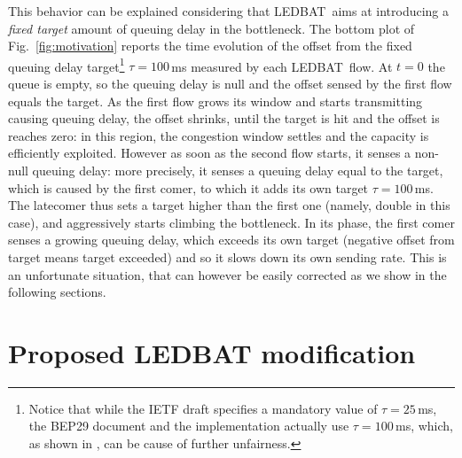 \documentclass[conference]{IEEEtran}
\newcommand{\figR}[1]{Fig.~\ref{fig:#1}}
\newcommand{\btledbat}[0]{LEDBAT}
\begin{document}
This behavior can be explained considering that \btledbat\ aims at introducing a \emph{fixed target} amount of queuing delay in the bottleneck.
The bottom plot of \figR{motivation} reports the time evolution of the offset from the fixed queuing delay target\footnote{Notice that while the IETF draft specifies a mandatory value of $\tau=25$\,ms, the BEP29 document and the implementation actually use $\tau=100$\,ms, which, as shown in \cite{lcn10}, can be cause of further unfairness.} \mbox{$\tau=100$\,ms} measured by each \btledbat\ flow. At $t=0$ the queue is empty, so the queuing delay is null and the offset sensed by the first flow equals the target. As the first flow grows its window and starts transmitting causing queuing delay, the offset shrinks, until the target is hit and the offset is reaches zero: in this region, the congestion window settles and the capacity is efficiently exploited. However as soon as the second flow starts, it senses a non-null queuing delay: more precisely, it senses a queuing delay equal to the target, which is caused by the first comer, to which it adds its own target $\tau=100$\,ms. The latecomer thus sets a target higher than the first one (namely, double in this case),  and aggressively starts climbing the bottleneck. In its phase, the first comer senses a growing queuing delay, which exceeds its own target (negative offset from target means target exceeded) and so it slows down its own sending rate. This is an unfortunate situation, that can however be easily corrected as we show in the following sections.



\section{Proposed LEDBAT modification}\label{sec:model}
\end{document}
